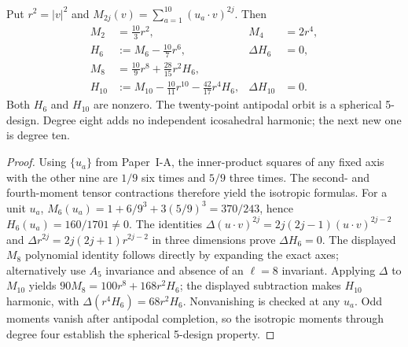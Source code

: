 \documentclass[12pt,a4paper]{article}
\begin{document}
\begin{theorem}
\label{p6c:thm:v322-icosahedral-moment-tower}
Put $r^2=|v|^2$ and $M_{2j}(v)=\sum_{a=1}^{10}(u_a\cdot v)^{2j}$.
Then
\begin{align*}
 M_2&=\frac{10}{3}r^2, & M_4&=2r^4,\\
 H_6&:=M_6-\frac{10}{7}r^6, &\Delta H_6&=0,\\
 M_8&=\frac{10}{9}r^8+\frac{28}{15}r^2H_6,\\
 H_{10}&:=M_{10}-\frac{10}{11}r^{10}
           -\frac{42}{17}r^4H_6,& \Delta H_{10}&=0.
\end{align*}
Both $H_6$ and $H_{10}$ are nonzero.  The twenty-point antipodal orbit
is a spherical 5-design.  Degree eight adds no independent icosahedral
harmonic; the next new one is degree ten.
\end{theorem}
\begin{proof}
Using $\{u_a\}$ from Paper~I-A, the inner-product squares of any
fixed axis with the other nine are $1/9$ six times and $5/9$ three
times.  The second- and fourth-moment tensor contractions therefore
yield the isotropic formulas.  For a unit $u_a$,
$M_6(u_a)=1+6/9^3+3(5/9)^3=370/243$, hence
$H_6(u_a)=160/1701\ne0$.  The identities
$\Delta (u\cdot v)^{2j}=2j(2j-1)(u\cdot v)^{2j-2}$
and $\Delta r^{2j}=2j(2j+1)r^{2j-2}$ in three dimensions
prove $\Delta H_6=0$.
The displayed $M_8$ polynomial identity follows directly by expanding
the exact axes; alternatively use $A_5$ invariance and absence of an
$\ell=8$ invariant.  Applying $\Delta$ to $M_{10}$ yields
$90M_8=100r^8+168r^2H_6$; the displayed subtraction makes
$H_{10}$ harmonic, with $\Delta(r^4H_6)=68r^2H_6$.
Nonvanishing is checked at any $u_a$.  Odd moments vanish after
antipodal completion, so the isotropic moments through degree four
establish the spherical 5-design property.
\end{proof}
\end{document}
